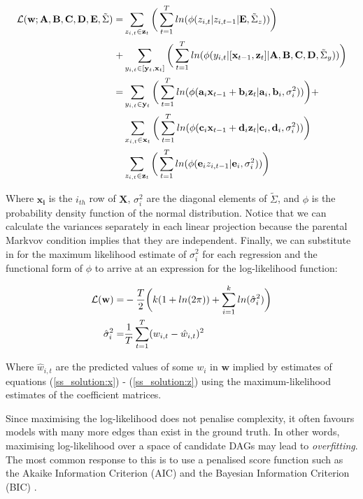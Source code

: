 \documentclass{article}
\begin{document}
\begin{align}
  \mathcal{L}(\mathbf{w}; \mathbf{A}, \mathbf{B}, \mathbf{C}, \mathbf{D}, \mathbf{E}, \tilde{\Sigma}) =& \sum_{z_{i,t} \in \mathbf{z}_t} \bigg{(} \sum_{t=1}^{T} ln(\phi(z_{i,t} | z_{i,t-1} | \mathbf{E}, \tilde{\Sigma}_z)) \bigg{)} \nonumber\\
  +& \sum_{y_{i,t} \in [\mathbf{y}_t,\mathbf{x}_t]} \bigg{(} \sum_{t=1}^{T} ln(\phi(y_{i,t} | [\mathbf{x}_{t-1}, \mathbf{z}_{t}] | \mathbf{A}, \mathbf{B}, \mathbf{C}, \mathbf{D}, \tilde{\Sigma}_y)) \bigg{)} \\
  =& \sum_{y_{i,t} \in \mathbf{y}_t} \bigg{(} \sum_{t=1}^{T} ln(\phi(\mathbf{a}_i \mathbf{x}_{t-1} + \mathbf{b}_i \mathbf{z}_t | \mathbf{a}_i, \mathbf{b}_i, \sigma_i^2)) \bigg{)} + \nonumber\\
  & \sum_{x_{i,t} \in \mathbf{x}_t} \bigg{(} \sum_{t=1}^{T} ln(\phi(\mathbf{c}_i \mathbf{x}_{t-1} + \mathbf{d}_i \mathbf{z}_t | \mathbf{c}_i, \mathbf{d}_i, \sigma_i^2)) \bigg{)} \nonumber\\
  & \sum_{z_{i,t} \in \mathbf{z}_t} \bigg{(} \sum_{t=1}^{T} ln(\phi(\mathbf{e}_i z_{i,t-1}  | \mathbf{e}_i, \sigma_i^2)) \bigg{)}
\end{align}

Where $\mathbf{x_i}$ is the $i_{th}$ row of $\mathbf{X}$, $\sigma_i^2$ are the diagonal elements of $\tilde{\Sigma}$, and $\phi$ is the probability density function of the normal distribution. Notice that we can calculate the variances separately in each linear projection because the parental Markvov condition implies that they are independent. Finally, we can substitute in for the maximum likelihood estimate of $\sigma_i^2$ for each regression and the functional form of $\phi$ to arrive at an expression for the log-likelihood function:

\begin{align}
  \mathcal{L(\mathbf{w})} =& -\frac{T}{2} \bigg{(} 
  k (1 + ln(2\pi)) 
  + \sum_{i=1}^{k} ln(\hat{\sigma}_{i}^2)
  \bigg{)} \\
  \hat{\sigma}_{i}^2 =& \frac{1}{T} \sum_{t=1}^{T} (w_{i,t} - \hat{w}_{i,t})^2
\end{align}

Where $\hat{w}_{i,t}$ are the predicted values of some $w_i$ in $\mathbf{w}$ implied by estimates of equations (\ref{ss_solution:x}) - (\ref{ss_solution:z}) using the maximum-likelihood estimates of the coefficient matrices.

Since maximising the log-likelihood does not penalise complexity, it often favours models with many more edges than exist in the ground truth. In other words, maximising log-likelihood over a space of candidate DAGs may lead to \textit{overfitting}. The most common response to this is to use a penalised score function such as the Akaike Information Criterion (AIC) \parencite{akaike1974new} and the Bayesian Information Criterion (BIC) \parencite{schwarz1978estimating}. 
\end{document}
